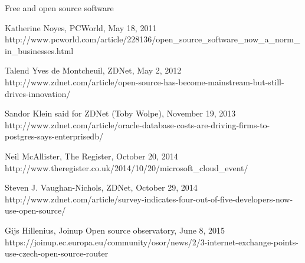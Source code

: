 \documentclass[xcolor={dvipsnames,usenames},beamer]{beamer}
\begin{document}
\begin{frame}{Free and open source software}

%
  {Katherine Noyes, PCWorld, May 18, 2011}%
  {http://www.pcworld.com/article/228136/open_source_software_now_a_norm_in_businesses.html}

%
  {Talend Yves de Montcheuil, ZDNet, May 2, 2012}%
  {http://www.zdnet.com/article/open-source-has-become-mainstream-but-still-drives-innovation/}

%
  {Sandor Klein said for ZDNet (Toby Wolpe), November 19, 2013}%
  {http://www.zdnet.com/article/oracle-database-costs-are-driving-firms-to-postgres-says-enterprisedb/}

%
  {Neil McAllister, The Register, October 20, 2014}%
  {http://www.theregister.co.uk/2014/10/20/microsoft_cloud_event/}

%
  {Steven J. Vaughan-Nichols, ZDNet, October 29, 2014}%
  {http://www.zdnet.com/article/survey-indicates-four-out-of-five-developers-now-use-open-source/}
  
%
  {Gijs Hillenius, Joinup Open source observatory, June 8, 2015}%
  {https://joinup.ec.europa.eu/community/osor/news/2/3-internet-exchange-points-use-czech-open-source-router}


\end{frame}
\end{document}
